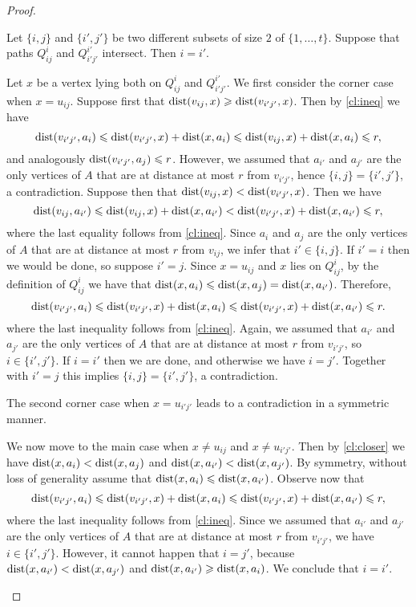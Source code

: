 \begin{proof}
\begin{claim}\label{cl:intersect}
Let $\{i,j\}$ and $\{i',j'\}$ be two different subsets of size $2$ of $\{1,\ldots,t\}$.
Suppose that paths $Q^i_{ij}$ and $Q^{i'}_{i'j'}$ intersect.
Then $i=i'$.
\end{claim}
\begin{clproof}
Let $x$ be a vertex lying both on $Q^i_{ij}$ and $Q^{i'}_{i'j'}$. We first consider the corner case when $x=u_{ij}$.
Suppose first that $\mathrm{dist}(v_{ij},x)\geqslant \mathrm{dist}(v_{i'j'},x)$. Then by \cref{cl:ineq} we have
$$\mathrm{dist}(v_{i'j'},a_i)\leqslant \mathrm{dist}(v_{i'j'},x)+\mathrm{dist}(x,a_i)\leqslant \mathrm{dist}(v_{ij},x)+\mathrm{dist}(x,a_i)\leqslant r,$$
and analogously $\mathrm{dist}(v_{i'j'},a_{j})\leqslant r$. However, we assumed that $a_{i'}$ and $a_{j'}$ are the only vertices of $A$ that are at distance at most $r$ from $v_{i'j'}$, hence $\{i,j\}=\{i',j'\}$,
a contradiction. Suppose then that $\mathrm{dist}(v_{ij},x)<\mathrm{dist}(v_{i'j'},x)$. 
Then we have
$$\mathrm{dist}(v_{ij},a_{i'})\leqslant \mathrm{dist}(v_{ij},x)+\mathrm{dist}(x,a_{i'})<\mathrm{dist}(v_{i'j'},x)+\mathrm{dist}(x,a_{i'})\leqslant r,$$
where the last equality follows from \cref{cl:ineq}.
Since $a_i$ and $a_j$ are the only vertices of $A$ that are at distance at most $r$ from $v_{ij}$, we infer that $i'\in \{i,j\}$. 
If $i'=i$ then we would be done, so suppose $i'=j$.
Since $x=u_{ij}$ and $x$ lies on $Q^i_{ij}$, by the definition of $Q^i_{ij}$ we have that $\mathrm{dist}(x,a_i)\leqslant \mathrm{dist}(x,a_j)=\mathrm{dist}(x,a_{i'})$. Therefore,
$$\mathrm{dist}(v_{i'j'},a_i)\leqslant \mathrm{dist}(v_{i'j'},x)+\mathrm{dist}(x,a_{i})\leqslant \mathrm{dist}(v_{i'j'},x)+\mathrm{dist}(x,a_{i'})\leqslant r.$$
where the last inequality follows from \cref{cl:ineq}.
Again, we assumed that $a_{i'}$ and $a_{j'}$ are the only vertices of $A$ that are at distance at most $r$ from $v_{i'j'}$, so $i\in \{i',j'\}$. If $i=i'$ then we are done, and otherwise we have $i=j'$.
Together with $i'=j$ this implies $\{i,j\}=\{i',j'\}$, a contradiction.

The second corner case when $x=u_{i'j'}$ leads to a contradiction in a symmetric manner.

We now move to the main case when $x\neq u_{ij}$ and $x\neq u_{i'j'}$.
Then by \cref{cl:closer} we have $\mathrm{dist}(x,a_i)<\mathrm{dist}(x,a_j)$ and $\mathrm{dist}(x,a_{i'})<\mathrm{dist}(x,a_{j'})$.
By symmetry, without loss of generality assume that $\mathrm{dist}(x,a_i)\leqslant \mathrm{dist}(x,a_{i'})$.
Observe now that
$$\mathrm{dist}(v_{i'j'},a_i)\leqslant \mathrm{dist}(v_{i'j'},x)+\mathrm{dist}(x,a_{i})\leqslant \mathrm{dist}(v_{i'j'},x)+\mathrm{dist}(x,a_{i'})\leqslant r,$$
where the last inequality follows from \cref{cl:ineq}.
Since we assumed that $a_{i'}$ and $a_{j'}$ are the only vertices of $A$ that are at distance at most $r$ from $v_{i'j'}$, we have $i\in \{i',j'\}$.
However, it cannot happen that $i=j'$, because $\mathrm{dist}(x,a_{i'})<\mathrm{dist}(x,a_{j'})$ and $\mathrm{dist}(x,a_{i'})\geqslant \mathrm{dist}(x,a_{i})$. We conclude that $i=i'$.
\end{clproof}


\end{proof}
